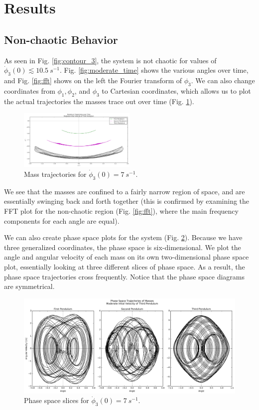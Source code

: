 \documentclass{article}
\begin{document}
\section{Results}

\subsection{Non-chaotic Behavior}
As seen in Fig. \ref{fig:contour_3}, the system is not chaotic for values of
$\dot\phi_3(0)\lesssim\SI{10.5}{s^{-1}}$. Fig. \ref{fig:moderate_time} shows 
the various angles over time, and Fig. \ref{fig:fft} shows on the left the 
Fourier transform of $\phi_3$. We can also change coordinates from $\phi_1,
\phi_2$, and $\phi_3$ to Cartesian coordinates, which allows us to plot
the actual trajectories the masses trace out over time (Fig. 
\ref{fig:moderate_trajectories}).

\begin{figure}
	\centering
	\includegraphics[width=0.5\textwidth]{moderate_velocity_trajectory}
	\caption{Mass trajectories for $\dot\phi_3(0)=\SI{7}{s^{-1}}$.}
	\label{fig:moderate_trajectories}
\end{figure}

We see that the masses are confined to a fairly narrow region of space, and 
are essentially swinging back and forth together (this is confirmed by examining
the FFT plot for the non-chaotic region (Fig. \ref{fig:fft}), where the main
frequency components for each angle are equal). 

We can also create phase space plots for the system 
(Fig. \ref{fig:moderate_phase}).
Because we have three generalized coordinates, the phase space is 
six-dimensional. We plot the angle and angular velocity of each mass on 
its own two-dimensional phase space plot, essentially looking at three 
different slices of phase space.  As a result, the phase space trajectories 
cross frequently. Notice that the phase space diagrams are symmetrical.
\begin{figure}[ht]
	\centering
	\includegraphics[width=\textwidth]{moderate_velocity_phase_space}
	\caption{Phase space slices for $\dot\phi_3(0)=\SI{7}{s^{-1}}$.}
	\label{fig:moderate_phase}
\end{figure}
\end{document}
